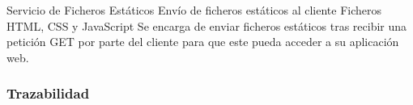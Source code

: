 \begin{component}{Servicio de Ficheros Estáticos}
{Envío de ficheros estáticos al cliente}
{\NA}
{Ficheros HTML, CSS y JavaScript}
{\NA} %
{Se encarga de enviar ficheros estáticos tras recibir una petición GET por parte del cliente para que este pueda acceder a su aplicación web.}
\end{component}

\FloatBarrier

\subsubsection{Trazabilidad} {\label{subsubsec:trazabilidad-comp}}

\begin{table}[htb]
      {\traceabilityCompFN}
  \end{table}

